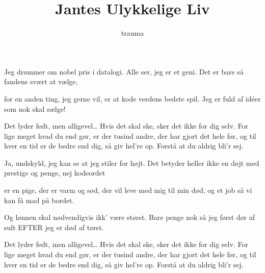 \documentclass[danish]{article}
\title{Jantes Ulykkelige Liv}
\author{trauma}
\begin{document}
\maketitle

\begin{song}

Jeg drømmer
om nobel pris i datalogi.
Alle ser, jeg er et geni.
Det er bare så fandens svært at vælge,

for en anden ting, jeg gerne vil,
er at kode verdens bedste spil.
Jeg er fuld af idéer som nok skal sælge!

Det lyder fedt, men alligevel\ldots
Hvis det skal ske, sker det ikke for dig selv.
For lige meget hvad du end gør,
er der tusind andre, der har gjort det hele før,
og til hver en tid er de bedre end dig,
så giv hel're op. Forstå at du
aldrig bli'r sej.

Ja, undskyld,
jeg kan se at jeg stiler for højt.
Det betyder heller ikke en døjt
med prestige og penge, nej kodeordet

er en pige, der er varm og sød,
der vil leve med mig til min død,
og et job så vi kan få mad på bordet.

Og lønnen skal nødvendigvis ikk' være størst.
Bare penge nok så jeg først
dør af sult EFTER jeg er død af tørst.

Det lyder fedt, men alligevel\ldots
Hvis det skal ske, sker det ikke for dig selv.
For lige meget hvad du end gør,
er der tusind andre, der har gjort det hele før,
og til hver en tid er de bedre end dig,
så giv hel're op. Forstå at du
aldrig bli'r sej.

\end{song}
\end{document}
